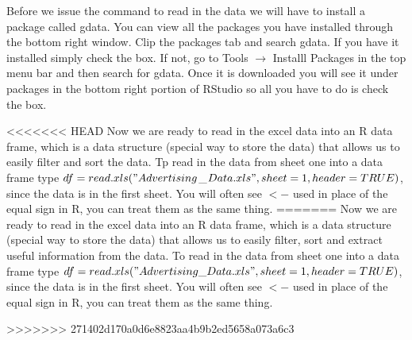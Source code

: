 \documentclass[11pt]{article}
\begin{document}
Before we issue the command to read in the data we will have to install a package called gdata. You can view all the packages you have installed through the bottom right window.  Clip the packages tab and search gdata.  If you have it installed simply check the box. If not, go to Tools $\rightarrow$ Installl Packages in the top menu bar and then search for gdata.  Once it is downloaded you will see it under packages in the bottom right portion of RStudio so all you have to do is check the box. 

<<<<<<< HEAD
Now we are ready to read in the excel data into an R data frame, which is a data structure (special way to store the data) that allows us to easily filter and sort the data.  Tp read in the data from sheet one into a data frame type $ df = read.xls ("Advertising$\_$Data.xls", sheet = 1, header = TRUE)$, since the data is in the first sheet.  You will often see $<-$ used in place of the equal sign in R, you can treat them as the same thing.  
=======
Now we are ready to read in the excel data into an R data frame, which is a data structure (special way to store the data) that allows us to easily filter, sort and extract useful information from the data.  To read in the data from sheet one into a data frame type $ df = read.xls ("Advertising\_Data.xls", sheet = 1, header = TRUE)$, since the data is in the first sheet.  You will often see $<-$ used in place of the equal sign in R, you can treat them as the same thing.  %


>>>>>>> 271402d170a0d6e8823aa4b9b2ed5658a073a6c3
\end{document}
